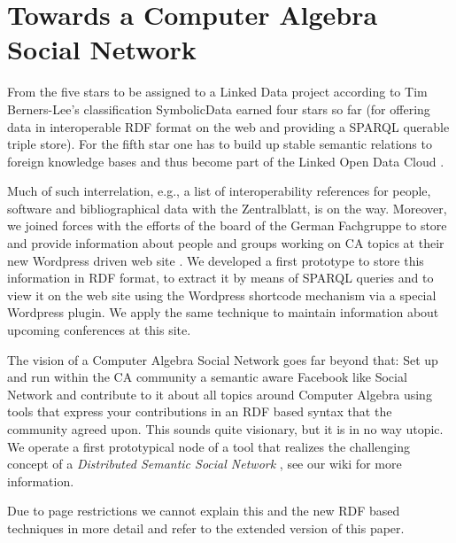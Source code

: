 \documentclass{llncs}
\newcommand{\SD}{{\sc SymbolicData}}
\begin{document}
\section{Towards a Computer Algebra Social Network}

From the five stars to be assigned to a Linked Data project according to Tim
Berners-Lee's classification \cite{5stars} {\SD} earned four stars so far (for
offering data in interoperable RDF format on the web and providing a SPARQL
querable triple store).  For the fifth star one has to build up stable
semantic relations to foreign knowledge bases and thus become part of the
Linked Open Data Cloud \cite{lod}.

Much of such interrelation, e.g., a list of interoperability references for
people, software and bibliographical data with the Zentralblatt, is on the
way.  Moreover, we joined forces with the efforts of the board of the German
Fachgruppe to store and provide information about people and groups working on
CA topics at their new Wordpress driven web site \cite{cafg}.  We developed a
first prototype to store this information in RDF format, to extract it by
means of SPARQL queries and to view it on the web site using the Wordpress
shortcode mechanism via a special Wordpress plugin.  We apply the same
technique to maintain information about upcoming conferences at this site.

The vision of a Computer Algebra Social Network goes far beyond that: Set up
and run within the CA community a semantic aware Facebook like Social Network
and contribute to it about all topics around Computer Algebra using tools that
express your contributions in an RDF based syntax that the community agreed
upon. This sounds quite visionary, but it is in no way utopic. We operate a
first prototypical node of a tool that realizes the challenging concept of a
\emph{Distributed Semantic Social Network} \cite{dssn}, see our wiki for more
information.  

Due to page restrictions we cannot explain this and the new RDF based
techniques in more detail and refer to the extended version \cite{car-54} of
this paper.
\end{document}
